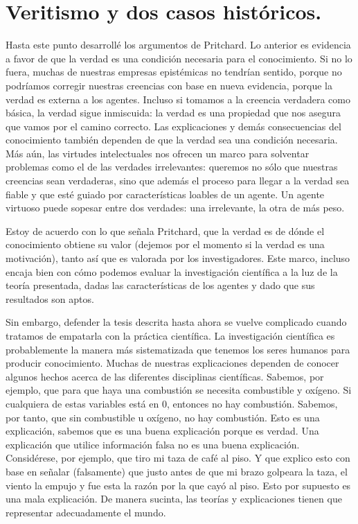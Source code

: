 \documentclass{article}
\begin{document}
\section{Veritismo y dos casos históricos.}

\noindent Hasta este punto desarrollé los argumentos de Pritchard. Lo anterior es evidencia a favor de que la verdad es una condición necesaria para el conocimiento. Si no lo fuera, muchas de nuestras empresas epistémicas no tendrían sentido, porque no podríamos corregir nuestras creencias con base en nueva evidencia, porque la verdad es externa a los agentes. Incluso si tomamos a la creencia verdadera como básica, la verdad sigue inmiscuida: la verdad es una propiedad que nos asegura que vamos por el camino correcto. Las explicaciones y demás consecuencias del conocimiento también dependen de que la verdad sea una condición necesaria. Más aún, las virtudes intelectuales nos ofrecen un marco para solventar problemas como el de las verdades irrelevantes: queremos no sólo que nuestras creencias sean verdaderas, sino que además el proceso para llegar a la verdad sea fiable y que esté guiado por características loables de un agente. Un agente virtuoso puede sopesar entre dos verdades: una irrelevante, la otra de más peso.

Estoy de acuerdo con lo que señala Pritchard, que la verdad es de dónde el conocimiento obtiene su valor (dejemos por el momento si la verdad es una motivación), tanto así que es valorada por los investigadores. Este marco, incluso encaja bien con cómo podemos evaluar la investigación científica a la luz de la teoría presentada, dadas las características de los agentes y dado que sus resultados son aptos. 

Sin embargo, defender la tesis descrita hasta ahora se vuelve complicado cuando tratamos de empatarla
con la práctica científica. La investigación científica es probablemente la manera más sistematizada que tenemos los seres humanos para producir conocimiento. Muchas de nuestras explicaciones dependen de conocer algunos hechos acerca de las diferentes disciplinas científicas. Sabemos, por ejemplo, que para que haya una combustión se necesita combustible y oxígeno. Si cualquiera de estas variables está en 0, entonces no hay combustión. Sabemos, por tanto, que sin combustible u oxígeno, no hay combustión. Esto es una explicación, sabemos que es una buena explicación porque es verdad. Una explicación que utilice información falsa no es una buena explicación. Considérese, por ejemplo, que tiro mi taza de café al piso. Y que explico esto con base en señalar (falsamente) que justo antes de que mi brazo golpeara la taza, el viento la empujo y fue esta la razón por la que cayó al piso. Esto por supuesto es una mala explicación. De manera sucinta, las teorías y explicaciones tienen que representar adecuadamente el mundo.
\end{document}
